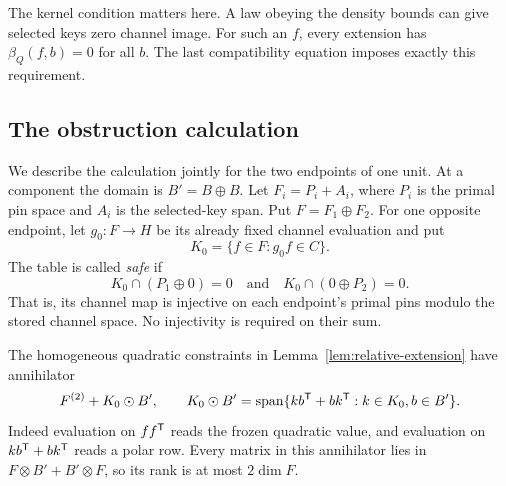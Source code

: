 The kernel condition matters here. A law obeying the density bounds can
give selected keys zero channel image. For such an \(f\), every extension
has \(\beta_Q(f,b)=0\) for all \(b\). The last compatibility equation
imposes exactly this requirement.

\subsection{The obstruction calculation}

We describe the calculation jointly for the two endpoints of one unit.
At a component the domain is \(B'=B\oplus B\). Let
\(F_i=P_i+A_i\), where \(P_i\) is the primal pin space and \(A_i\)
is the selected-key span. Put \(F=F_1\oplus F_2\).
For one opposite endpoint, let \(g_0:F\to H\) be its already fixed
channel evaluation and put
\[
 K_0=\{f\in F:g_0f\in C\}.
\]
The table is called \emph{safe} if
\begin{equation}\label{eq:endpoint-injection}
 K_0\cap(P_1\oplus0)=0
 \quad\text{and}\quad K_0\cap(0\oplus P_2)=0.
\end{equation}
That is, its
channel map is injective on each endpoint's primal pins modulo the stored
channel space. No injectivity is required on their sum.

The homogeneous quadratic constraints in Lemma~\ref{lem:relative-extension}
have annihilator
\begin{equation}\label{eq:quadratic-annihilator}
 F^{(2)}+K_0\odot B',\qquad
 K_0\odot B'=\operatorname{span}\{kb^{\mathsf T}+bk^{\mathsf T}:k\in K_0,b\in B'\}.
\end{equation}
Indeed evaluation on \(ff^{\mathsf T}\) reads the frozen quadratic value,
and evaluation on \(kb^{\mathsf T}+bk^{\mathsf T}\) reads a polar row.
Every matrix in this annihilator lies in
\(F\otimes B'+B'\otimes F\), so its rank is at most \(2\dim F\).

